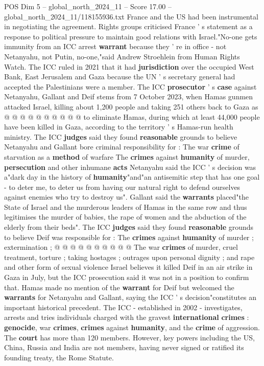 \begin{textsample}{POS Dim 5 – global\_north\_2024\_11 – Score 17.00 – global\_north\_2024\_11/118155936.txt}
France and the US had been instrumental in negotiating the agreement.
Rights groups criticised France ' s statement as a response to political pressure to maintain good relations with Israel."No-one gets immunity from an ICC arrest \textbf{warrant} because they ' re in office - not Netanyahu, not Putin, no-one,"said Andrew Stroehlein from Human Rights Watch.
The ICC ruled in 2021 that it had \textbf{jurisdiction} over the occupied West Bank, East Jerusalem and Gaza because the UN ' s secretary general had accepted the Palestinians were a member.
The ICC \textbf{prosecutor} ' s \textbf{case} against Netanyahu, Gallant and Deif stems from 7 October 2023, when Hamas gunmen attacked Israel, killing about 1,200 people and taking 251 others back to Gaza as @ @ @ @ @ @ @ @ @ @ to eliminate Hamas, during which at least 44,000 people have been killed in Gaza, according to the territory ' s Hamas-run health ministry.
The ICC \textbf{judges} said they found \textbf{reasonable} grounds to believe Netanyahu and Gallant bore criminal responsibility for : The war \textbf{crime} of starvation as a \textbf{method} of warfare The \textbf{crimes} against \textbf{humanity} of murder, \textbf{persecution} and other inhumane \textbf{acts} Netanyahu said the ICC ' s decision was a"dark day in the history of \textbf{humanity}"and"an antisemitic step that has one goal - to deter me, to deter us from having our natural right to defend ourselves against enemies who try to destroy us".
Gallant said the \textbf{warrants} placed"the State of Israel and the murderous leaders of Hamas in the same row and thus legitimises the murder of babies, the rape of women and the abduction of the elderly from their beds".
The ICC \textbf{judges} said they found \textbf{reasonable} grounds to believe Deif was responsible for : The \textbf{crimes} against \textbf{humanity} of murder ; extermination ; @ @ @ @ @ @ @ @ @ @ The war \textbf{crimes} of murder, cruel treatment, torture ; taking hostages ; outrages upon personal dignity ; and rape and other form of sexual violence Israel believes it killed Deif in an air strike in Gaza in July, but the ICC prosecution said it was not in a position to confirm that.
Hamas made no mention of the \textbf{warrant} for Deif but welcomed the \textbf{warrants} for Netanyahu and Gallant, saying the ICC ' s decision"constitutes an important historical precedent.
The ICC - established in 2002 - investigates, arrests and tries individuals charged with the gravest \textbf{international} \textbf{crimes} : \textbf{genocide}, war \textbf{crimes}, \textbf{crimes} against \textbf{humanity}, and the \textbf{crime} of aggression.
The \textbf{court} has more than 120 members.
However, key powers including the US, China, Russia and India are not members, having never signed or ratified its founding treaty, the Rome Statute.

\end{textsample}
